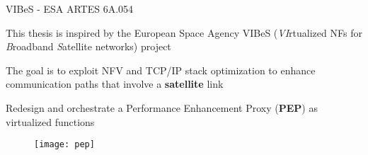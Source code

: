 \begin{frame}{VIBeS - ESA ARTES  6A.054}

  This thesis is inspired by the European Space Agency VIBeS (\emph{VI}rtualized
  NFs for \emph{B}roadband \emph{S}atellite networks) project

  \vfill{}

  The goal is to exploit NFV and TCP/IP stack optimization to enhance
  communication paths that involve a \textbf{satellite} link

  \vfill{}

  Redesign and orchestrate a Performance Enhancement Proxy (\textbf{PEP}) as
  virtualized functions

  \vfill{}

  \begin{figure}
    \centering
    \texttt{[image: pep]}
  \end{figure}

\end{frame}